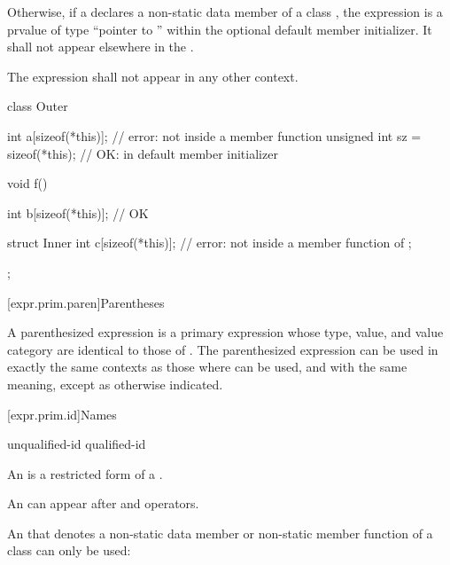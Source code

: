 \pnum
Otherwise, if a  declares a non-static data
member of a class , the expression  is
a prvalue of type ``pointer to '' within the
optional default member initializer. It shall not appear elsewhere
in the .

\pnum
The expression  shall not appear in any other context.
\begin{example}
\begin{codeblock}
class Outer {
  int a[sizeof(*this)];               // error: not inside a member function
  unsigned int sz = sizeof(*this);    // OK: in default member initializer

  void f() {
    int b[sizeof(*this)];             // OK

    struct Inner {
      int c[sizeof(*this)];           // error: not inside a member function of 
    };
  }
};
\end{codeblock}
\end{example}

[expr.prim.paren]{Parentheses}

\pnum
{}%
A parenthesized expression 
is a primary expression whose type, value, and value category are identical to those of .
The parenthesized expression can be used in exactly the same contexts as
those where  can be used, and with the same
meaning, except as otherwise indicated.

[expr.prim.id]{Names}

\begin{bnf}
\br
    unqualified-id\br
    qualified-id
\end{bnf}

\pnum
{}%
%
An  is a restricted form of a
.
\begin{note}
An  can appear after  and \tcode{->}
operators.
\end{note}

\pnum
An  that denotes a non-static data member or
non-static member function of a class can only be used:

